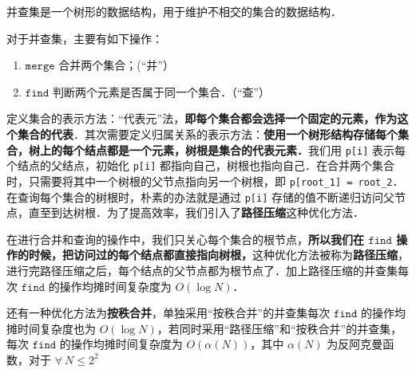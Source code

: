 
并查集是一个树形的数据结构，用于维护不相交的集合的数据结构．

对于并查集，主要有如下操作：
\begin{enumerate}
\item $\mathtt{merge}$ 合并两个集合；(“并”）

\item $\mathtt{find}$ 判断两个元素是否属于同一个集合．（“查”）
\end{enumerate}

定义集合的表示方法：“代表元”法，\textbf{即每个集合都会选择一个固定的元素，作为这个集合的代表}．其次需要定义归属关系的表示方法：\textbf{使用一个树形结构存储每个集合，树上的每个结点都是一个元素，树根是集合的代表元素．}我们用 \verb|p[i]| 表示每个结点的父结点，初始化 \verb|p[i]| 都指向自己，树根也指向自己．在合并两个集合时，只需要将其中一个树根的父节点指向另一个树根，即 \verb|p[root_1] = root_2|．在查询每个集合的树根时，朴素的办法就是通过 \verb|p[i]| 存储的值不断递归访问父节点，直至到达树根．为了提高效率，我们引入了\textbf{路径压缩}这种优化方法．

在进行合并和查询的操作中，我们只关心每个集合的根节点，\textbf{所以我们在 $\mathtt{find}$ 操作的时候，把访问过的每个结点都直接指向树根，}这种优化方法被称为\textbf{路径压缩}，进行完路径压缩之后，每个结点的父节点都为根节点了．加上路径压缩的并查集每次 $\mathtt{find}$ 的操作均摊时间复杂度为 $O(\log N)$．

还有一种优化方法为\textbf{按秩合并}，单独采用“按秩合并”的并查集每次 $\mathtt{find}$ 的操作均摊时间复杂度也为 $O(\log N)$，若同时采用“路径压缩”和“按秩合并”的并查集，每次 $\mathtt{find}$ 的操作均摊时间复杂度为 $O(\alpha(N))$，其中 $\alpha(N)$ 为反阿克曼函数，对于 $\forall \ N \leq 2^{2}$